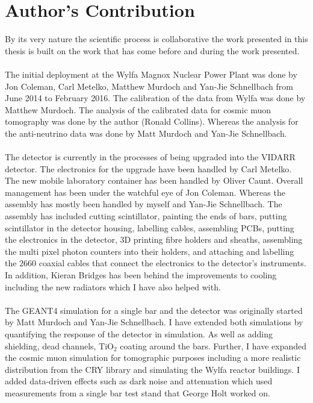 \chapter{Author's Contribution}

By its very nature the scientific process is collaborative the work presented in this thesis is built on the work that has come before and during the work presented. 
\\\\The initial deployment at the Wylfa Magnox Nuclear Power Plant was done by Jon Coleman, Carl Metelko, Matthew Murdoch and Yan-Jie Schnellbach from June 2014 to February 2016. The calibration of the data from Wylfa was done by Matthew Murdoch. The analysis of the calibrated data for cosmic muon tomography was done by the author (Ronald Collins). Whereas the analysis for the anti-neutrino data was done by Matt Murdoch and Yan-Jie Schnellbach. 
\\\\The detector is currently in the processes of being upgraded into the VIDARR detector. The electronics for the upgrade have been handled by Carl Metelko. The new mobile laboratory container has been handled by Oliver Caunt. Overall management has been under the watchful eye of Jon Coleman. Whereas the assembly has mostly been handled by myself and Yan-Jie Schnellbach. The assembly has included cutting scintillator, painting the ends of bars, putting scintillator in the detector housing, labelling cables, assembling PCBs, putting the electronics in the detector, 3D printing fibre holders and sheaths, assembling the multi pixel photon counters into their holders, and attaching and labelling the 2660 coaxial cables that connect the electronics to the detector's instruments. In addition, Kieran Bridges has been behind the improvements to cooling including the new radiators which I have also helped with. 
\\\\The GEANT4 simulation for a single bar and the detector was originally started by Matt Murdoch and Yan-Jie Schnellbach. I have extended both simulations by quantifying the response of the detector in simulation. As well as adding shielding, dead channels, TiO$_2$ coating around the bars. Further, I have expanded the cosmic muon simulation for tomographic purposes including a more realistic distribution from the CRY library and simulating the Wylfa reactor buildings. I added data-driven effects such as dark noise and attenuation which used measurements from a single bar test stand that George Holt worked on. 
